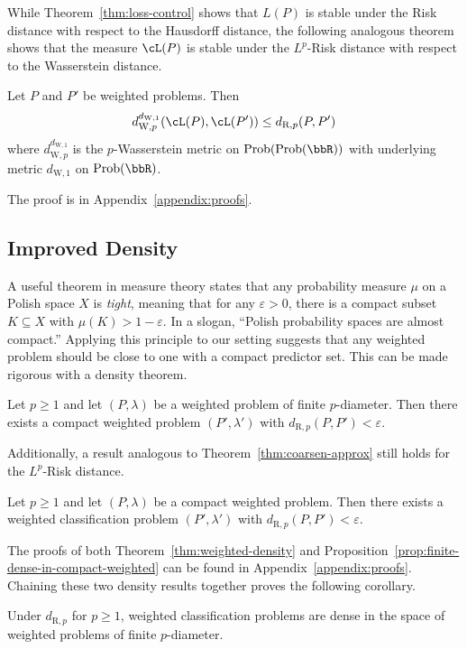 \documentclass[twoside,11pt]{article}
\DeclareMathOperator{\prob}{Prob}
\newcommand{\dexp}[1][]{d_{\mathrm{R}#1}}
\newcommand{\dWp}[1]{d_{\mathrm{W},#1}}
\newcommand{\dW}{\dWp 1}
\renewcommand{\epsilon}{\varepsilon}
\begin{document}
While Theorem~\ref{thm:loss-control} shows that $L(P)$ is stable under the Risk distance with respect to the Hausdorff distance, the following analogous theorem shows that the measure $\cL(P)$ is stable under the $L^p$-Risk distance with respect to the Wasserstein distance.
\begin{theorem}\label{thm:loss-control-weighted}
    Let $P$ and $P'$ be weighted problems. Then
    \[\dWp{p}^{\dW}(\cL(P),\cL(P')) \leq \dexp[,p](P,P')\]
    where $\dWp{p}^{\dW}$ is the $p$-Wasserstein metric on $\prob(\prob(\bbR))$ with underlying metric $\dW$ on $\prob(\bbR)$.
\end{theorem}
The proof is in Appendix~\ref{appendix:proofs}.


\subsection{Improved Density}
A useful theorem in measure theory states that any probability measure $\mu$ on a Polish space $X$ is \emph{tight}, meaning that for any $\epsilon>0$, there is a compact subset $K\subseteq X$ with $\mu(K)>1-\epsilon$. In a slogan, ``Polish probability spaces are almost compact.'' Applying this principle to our setting suggests that any weighted problem should be close to one with a compact predictor set. This can be made rigorous with a density theorem.

\begin{theorem}\label{thm:weighted-density}
Let $p \geq 1$ and let $(P,\lambda)$ be a weighted problem of finite $p$-diameter. Then there exists a compact weighted problem $(P',\lambda')$ with $\dexp[,p](P,P')<\epsilon$.
\end{theorem}
Additionally, a result analogous to Theorem~\ref{thm:coarsen-approx} still holds for the $L^p$-Risk distance.
\begin{proposition}\label{prop:finite-dense-in-compact-weighted}
    Let $p \geq 1$ and let $(P,\lambda)$ be a compact weighted problem. Then there exists a weighted classification problem $(P',\lambda')$ with $\dexp[,p](P,P')<\epsilon$.
\end{proposition}
The proofs of both Theorem~\ref{thm:weighted-density} and Proposition~\ref{prop:finite-dense-in-compact-weighted} can be found in Appendix~\ref{appendix:proofs}. Chaining these two density results together proves the following corollary.
\begin{corollary}\label{cor:finite-dense-in-p-diam}
    Under $\dexp[,p]$ for $p\geq 1$, weighted classification problems are dense in the space of weighted problems of finite $p$-diameter.
\end{corollary}
\end{document}
